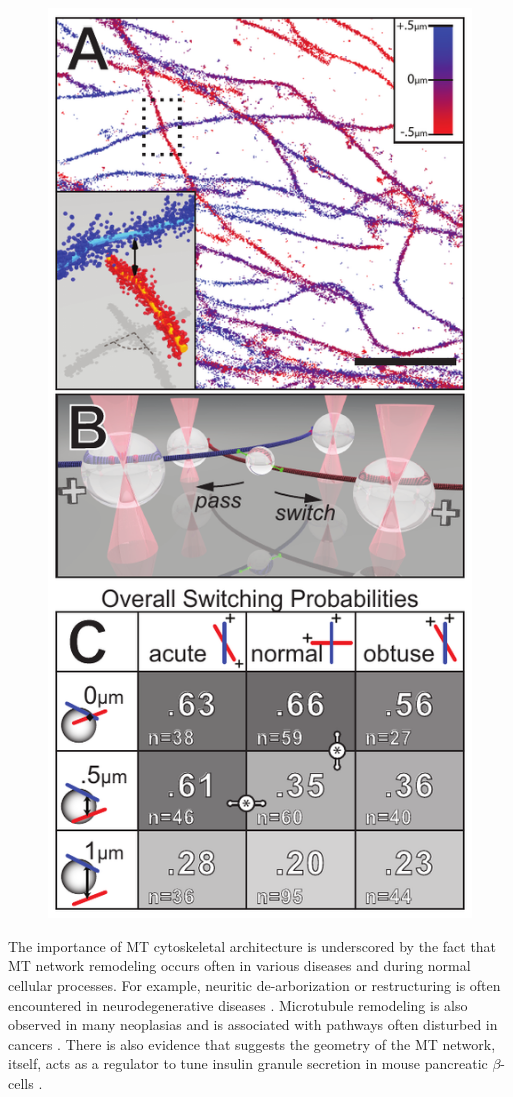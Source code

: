 \begin{figure}
{\includegraphics{project1/Fig_1FINAL}}
\end{figure}

The importance of MT cytoskeletal architecture is underscored by the fact that MT network remodeling occurs often in various diseases and during normal cellular processes. For example, neuritic de-arborization or restructuring is often encountered in neurodegenerative diseases \cite{VanBattum2015,DiPolo2015}. Microtubule remodeling is also observed in many neoplasias \cite{Parker2014} and is associated with pathways often disturbed in cancers \cite{Galmarini2003}. There is also evidence that suggests the geometry of the MT network, itself, acts as a regulator to tune insulin granule secretion in mouse pancreatic  $\beta$-cells \cite{Zhu2015}.
 
